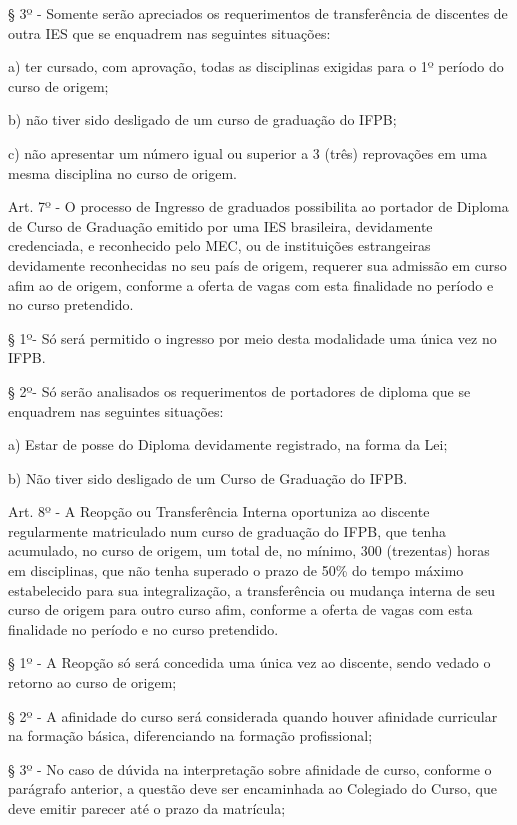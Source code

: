 § 3º - Somente serão apreciados os requerimentos de transferência de discentes de outra IES que se enquadrem nas seguintes situações:

a)	ter cursado, com aprovação, todas as disciplinas exigidas para o 1º período do curso de origem;

b)	não tiver sido desligado de um curso de graduação do IFPB;

c)	não apresentar um número igual ou superior a 3 (três) reprovações em uma mesma disciplina no curso de origem.

\vspace{1mm}
Art. 7º - O processo de Ingresso de graduados possibilita ao portador de Diploma de Curso de Graduação emitido por uma IES brasileira, devidamente credenciada, e reconhecido pelo MEC, ou de instituições estrangeiras devidamente reconhecidas no seu país de origem, requerer sua admissão em curso afim ao de origem, conforme a oferta de vagas com esta finalidade no período e no curso pretendido.

§ 1º- Só será permitido o ingresso por meio desta modalidade uma única vez no IFPB.

§ 2º- Só serão analisados os requerimentos de portadores de diploma que se enquadrem nas seguintes situações:

a) Estar de posse do Diploma devidamente registrado, na forma da Lei;

b) Não tiver sido desligado de um Curso de Graduação do IFPB.

\vspace{1mm}
	Art. 8º - A Reopção ou Transferência Interna oportuniza ao discente regularmente matriculado num curso de graduação do IFPB, que tenha acumulado, no curso de origem, um total de, no mínimo, 300 (trezentas) horas em disciplinas, que não tenha superado o prazo de 50\% do tempo máximo estabelecido para sua integralização, a transferência ou mudança interna de seu curso de origem para outro curso afim, conforme a oferta de vagas com esta finalidade no período e no curso pretendido.

	§ 1º - A Reopção só será concedida uma única vez ao discente, sendo vedado o retorno ao curso de origem;

	§ 2º - A afinidade do curso será considerada quando houver afinidade curricular na formação básica, diferenciando na formação profissional;

	§ 3º - No caso de dúvida na interpretação sobre afinidade de curso, conforme o parágrafo anterior, a questão deve ser encaminhada ao Colegiado do Curso, que deve emitir parecer até o prazo da matrícula;

